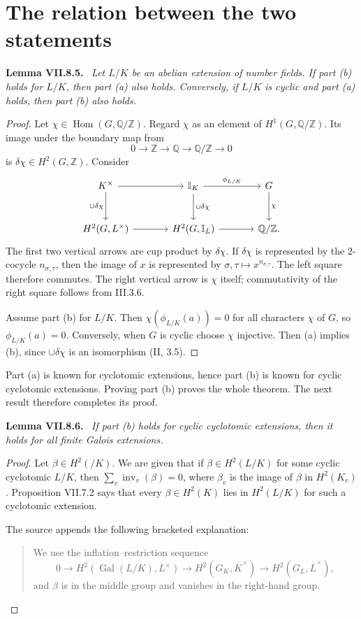 \documentclass[11pt]{article}
\newcommand{\I}{\mathbb I}
\newcommand{\Q}{\mathbb Q}
\newcommand{\Z}{\mathbb Z}
\newcommand{\Gal}{\operatorname{Gal}}
\newcommand{\Hom}{\operatorname{Hom}}
\newcommand{\inv}{\operatorname{inv}}
\newenvironment{authorresult}[2]{\par\medskip\noindent\textbf{#1 VII.#2.}\ \itshape}{\par\medskip}
\begin{document}
\section*{The relation between the two statements}
\begin{authorresult}{Lemma}{8.5}
Let $L/K$ be an abelian extension of number fields. If part (b) holds for
$L/K$, then part (a) also holds. Conversely, if $L/K$ is cyclic and part
(a) holds, then part (b) also holds.
\end{authorresult}
\begin{proof}
Let $\chi\in\Hom(G,\Q/\Z)$. Regard $\chi$ as an element of
$H^1(G,\Q/\Z)$. Its image under the boundary map from
\[
 0\longrightarrow\Z\longrightarrow\Q\longrightarrow\Q/\Z
 \longrightarrow0
\]
is $\delta\chi\in H^2(G,\Z)$. Consider
\[
\begin{tikzcd}[column sep=large,row sep=large]
K^\times\arrow[r]\arrow[d,"\cup\delta\chi"']&
\I_K\arrow[r,"\phi_{L/K}"]\arrow[d,"\cup\delta\chi"]&
G\arrow[d,"\chi"]\\
H^2(G,L^\times)\arrow[r]&H^2(G,\I_L)\arrow[r]&\Q/\Z.
\end{tikzcd}
\]
The first two vertical arrows are cup product by $\delta\chi$.
If $\delta\chi$ is represented by the $2$-cocycle $n_{\sigma,\tau}$, then
the image of $x$ is represented by
$\sigma,\tau\longmapsto x^{n_{\sigma,\tau}}$.
The left square therefore commutes. The right vertical arrow is $\chi$
itself; commutativity of the right square follows from III.3.6.

Assume part (b) for $L/K$. Then
$\chi(\phi_{L/K}(a))=0$ for all characters $\chi$ of $G$, so
$\phi_{L/K}(a)=0$. Conversely, when $G$ is cyclic choose $\chi$ injective.
Then (a) implies (b), since $\cup\delta\chi$ is an isomorphism (II, 3.5).
\end{proof}

Part (a) is known for cyclotomic extensions, hence part (b) is known for
cyclic cyclotomic extensions. Proving part (b) proves the whole theorem.
The next result therefore completes its proof.
\begin{authorresult}{Lemma}{8.6}
If part (b) holds for cyclic cyclotomic extensions, then it holds for all
finite Galois extensions.
\end{authorresult}
\begin{proof}
Let $\beta\in H^2(/K)$. We are given that if $\beta\in H^2(L/K)$ for some
cyclic cyclotomic $L/K$, then $\sum_v\inv_v(\beta)=0$, where $\beta_v$ is
the image of $\beta$ in $H^2(K_v)$. Proposition VII.7.2 says that every
$\beta\in H^2(K)$ lies in $H^2(L/K)$ for such a cyclotomic extension.

The source appends the following bracketed explanation:
\begin{quote}
We use the inflation--restriction sequence
\[
 0\longrightarrow H^2(\Gal(L/K),L^\times)
 \longrightarrow H^2(G_K,\overline K^\times)
 \longrightarrow H^2(G_L,\overline L^\times),
\]
and $\beta$ is in the middle group and vanishes in the right-hand group.
\end{quote}
\end{proof}
\end{document}
